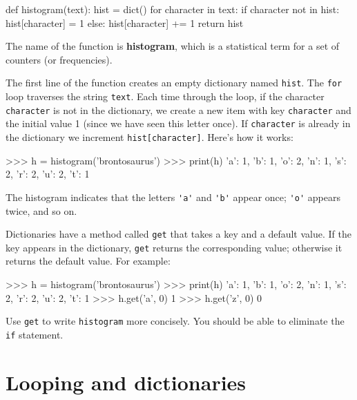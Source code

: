 \beforeverb
\begin{pycode}
def histogram(text):
    hist = dict()
    for character in text:
        if character not in hist:
            hist[character] = 1
        else:
            hist[character] += 1
    return hist
\end{pycode}
\afterverb
%
The name of the function is {\bf histogram}, which is a statistical
term for a set of counters (or frequencies).


The first line of the
function creates an empty dictionary named {\tt hist}.  The {\tt for} loop traverses
the string {\tt text}.  Each time through the loop, if the character {\tt character} is
not in the dictionary, we create a new item with key {\tt character} and the
initial value 1 (since we have seen this letter once).  If {\tt character} is
already in the dictionary we increment {\tt hist[character]}.
%
%
Here's how it works:

\beforeverb
\begin{pyinterpreter}
>>> h = histogram('brontosaurus')
>>> print(h)
{'a': 1, 'b': 1, 'o': 2, 'n': 1, 's': 2, 'r': 2, 'u': 2, 't': 1}
\end{pyinterpreter}
\afterverb
%
The histogram indicates that the letters \verb"'a'" and \verb"'b'"
appear once; \verb"'o'" appears twice, and so on.

\begin{exercise}


Dictionaries have a method called {\tt get} that takes a key
and a default value.  If the key appears in the dictionary,
{\tt get} returns the corresponding value; otherwise it returns
the default value.  For example:

\beforeverb
\begin{pyexo}
>>> h = histogram('brontosaurus')
>>> print(h)
{'a': 1, 'b': 1, 'o': 2, 'n': 1, 's': 2, 'r': 2, 'u': 2, 't': 1}
>>> h.get('a', 0)
1
>>> h.get('z', 0)
0
\end{pyexo}
\afterverb
%
Use {\tt get} to write {\tt histogram} more concisely.  You
should be able to eliminate the {\tt if} statement.
\end{exercise}


\section{Looping and dictionaries}

